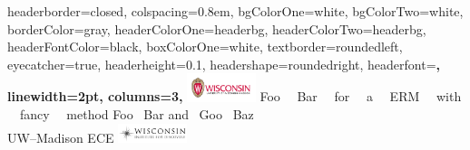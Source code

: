 \documentclass[landscape,a0paper,fontscale=0.333]{baposter} %
\theoremstyle{definition}
\begin{document}
\begin{poster}{
    headerborder=closed, %
    colspacing=0.8em, %
    bgColorOne=white, %
    bgColorTwo=white, %
    borderColor=gray, %
    headerColorOne=headerbg, %
    headerColorTwo=headerbg, %
    headerFontColor=black, %
    boxColorOne=white, %
    textborder=roundedleft, %
    eyecatcher=true, %
    headerheight=0.1\textheight, %
    headershape=roundedright, %
    headerfont=\Large\bf\textbf, %
    linewidth=2pt, %
    columns=3,
}
{\includegraphics[width=0.15\textwidth]{uw-madison-logo-wide}}
{Foo \ \ Bar \ \ for \ \ a \ \ ERM \ \ with \ \ fancy \ \ method}
{\LARGE Foo \  Bar and \  Goo \  Baz\\UW--Madison ECE}
{\includegraphics[width=0.15\textwidth]{WIDBlackHorizontalPlain-1}}





\end{poster}
\end{document}

